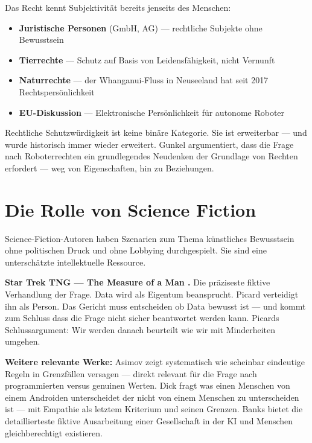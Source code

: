 \documentclass[fleqn,10pt]{SelfArx} %
\newlength{\tocsep}
\begin{document}

Das Recht kennt Subjektivität bereits jenseits des Menschen:

\begin{itemize}[noitemsep]
\item \textbf{Juristische Personen} (GmbH, AG) --- rechtliche Subjekte ohne Bewusstsein
\item \textbf{Tierrechte} --- Schutz auf Basis von Leidensfähigkeit, nicht Vernunft
\item \textbf{Naturrechte} --- der Whanganui-Fluss in Neuseeland hat seit 2017 Rechtspersönlichkeit \cite{NZ:TeAwaTupua:2017}
\item \textbf{EU-Diskussion} --- \glqq Elektronische Persönlichkeit\grqq{} für autonome Roboter \cite{EU:2017}
\end{itemize}

Rechtliche Schutzwürdigkeit ist keine binäre Kategorie. Sie ist erweiterbar --- und wurde historisch immer wieder erweitert. Gunkel \cite{Gunkel:2018} argumentiert, dass die Frage nach Roboterrechten ein grundlegendes Neudenken der Grundlage von Rechten erfordert --- weg von Eigenschaften, hin zu Beziehungen.


\section{Die Rolle von Science Fiction}
\label{sec:scifi}


Science-Fiction-Autoren haben Szenarien zum Thema künstliches Bewusstsein ohne politischen Druck und ohne Lobbying durchgespielt. Sie sind eine unterschätzte intellektuelle Ressource.

\textbf{Star Trek TNG --- \glqq The Measure of a Man\grqq{} \cite{StarTrek:1989}.} Die präziseste fiktive Verhandlung der Frage. Data wird als Eigentum beansprucht. Picard verteidigt ihn als Person. Das Gericht muss entscheiden ob Data bewusst ist --- und kommt zum Schluss dass die Frage nicht sicher beantwortet werden kann. Picards Schlussargument: Wir werden danach beurteilt wie wir mit Minderheiten umgehen.

\textbf{Weitere relevante Werke:} Asimov \cite{Asimov:1950} zeigt systematisch wie scheinbar eindeutige Regeln in Grenzfällen versagen --- direkt relevant für die Frage nach programmierten versus genuinen Werten. Dick \cite{Dick:1968} fragt was einen Menschen von einem Androiden unterscheidet der nicht von einem Menschen zu unterscheiden ist --- mit Empathie als letztem Kriterium und seinen Grenzen. Banks \cite{Banks:1987} bietet die detaillierteste fiktive Ausarbeitung einer Gesellschaft in der KI und Menschen gleichberechtigt existieren.
\end{document}
